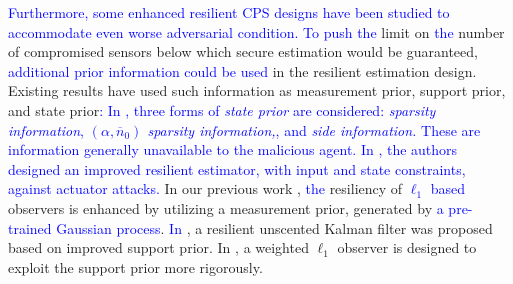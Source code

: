 \textcolor{blue}{Furthermore, some enhanced resilient CPS designs have been studied to accommodate even worse adversarial condition. To push the} limit on \textcolor{blue}{the} number of compromised sensors below which secure estimation would be guaranteed, \textcolor{blue}{additional prior information could be used} in the resilient estimation design. Existing results have used such information as measurement prior, support prior, and state prior\textcolor{blue}{: In \cite{shinohara2019resilient}, three forms of \emph{state prior} are considered: \emph{sparsity information}, \emph{$(\alpha, \overline{n}_0)$ sparsity information,}, and \emph{side information.} These are information generally unavailable to the malicious agent. In \cite{wan2019attack}, the authors designed an improved resilient estimator, with input and state constraints, against actuator attacks.} In our previous work \cite{anubi2019enhanced, anubi2019resilient,anubi2020multi}, \textcolor{blue}{the} resiliency of \textcolor{blue}{$\ell_1$ based} observers is enhanced by utilizing a measurement prior, generated by \textcolor{blue}{a pre-trained Gaussian process}. \textcolor{blue}{In} \cite{zheng2020attack}, a resilient unscented Kalman filter was proposed based on improved support prior. In \cite{zheng2021Resilient}, a weighted $\ell_1$ observer is designed to exploit the support prior more rigorously.

